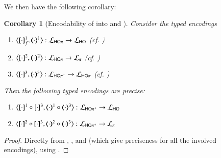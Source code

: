 \documentclass[preprint,11pt]{elsarticle}
\newtheorem{corollary}{Corollary}[section]
\begin{document}
{{We then have the following corollary:

\begin{corollary}[Encodability of \HOpp into \HOp and \sessp]
\label{coro:ho} 
Consider the typed encodings
\begin{enumerate}[-]
\item $\enco{\map{\cdot}^{1}_f, \mapt{\cdot}^{1} %
}: \tyl{L}_{\HOp} \to \tyl{L}_{\HO}$  (cf. )
\item $\enco{\map{\cdot}^{2}, \mapt{\cdot}^{2} %
}: \tyl{L}_{\HOp} \to \tyl{L}_{\sessp}$ (cf. )
\item $\enco{\map{\cdot}^{3}, \mapt{\cdot}^{3}}: \tyl{L}_{\HOpp} \to \tyl{L}_{\HOp}$ (cf. )
\end{enumerate}
Then the following typed encodings 	are precise:
\begin{enumerate}[-]
\item 
$\enco{\pmap{\cdot}{1} \circ \pmap{\cdot}{3}, \tmap{\cdot}{1} \circ \tmap{\cdot}{3}}: \tyl{L}_\HOpp \to \tyl{L}_\HO$
\item
$\enco{\pmap{\cdot}{2} \circ \pmap{\cdot}{3}, \tmap{\cdot}{2} \circ \tmap{\cdot}{3}}: \tyl{L}_\HOpp \to \tyl{L}_\sessp$
\end{enumerate}

\end{corollary}

\begin{proof}
Directly from 
, 
, 
and 
 (which give preciseness for all the involved encodings), using
.
\end{proof}




}}
\end{document}
